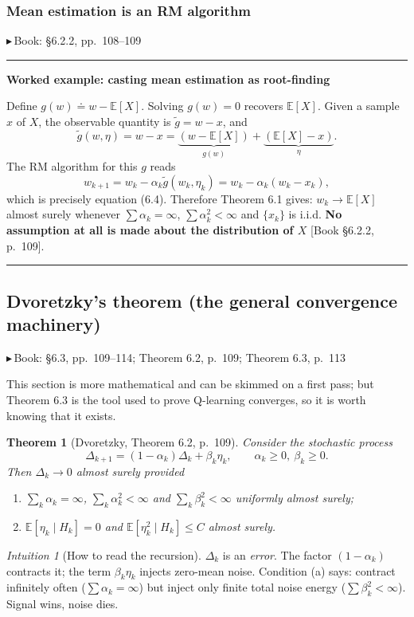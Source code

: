 \documentclass[11pt, letterpaper]{article}
\theoremstyle{runin}
\theoremstyle{runinplain}
\newtheorem{theorem}{Theorem}[section]
\theoremstyle{remark}
\newtheorem*{intuition}{Intuition}
\newcommand{\E}{\mathbb{E}}
\newcommand{\bk}[1]{{\color{bookblue}\small$\blacktriangleright$\,\textsf{Book: #1}}}
\newcommand{\bkin}[1]{{\color{bookblue}\small[\textsf{Book #1}]}}
\newenvironment{worked}[1]
  {\par\medskip\noindent\rule{\textwidth}{0.4pt}\par\nobreak\vspace{0.3em}
   \noindent\textbf{Worked example: #1}\par\nobreak\vspace{0.2em}\small}
  {\par\nobreak\vspace{0.3em}\noindent\rule{\textwidth}{0.4pt}\par\medskip}
\begin{document}
\subsubsection{Mean estimation is an RM algorithm}

\bk{\S6.2.2, pp.~108--109}

\begin{worked}{casting mean estimation as root-finding}
Define $g(w)\doteq w-\E[X]$. Solving $g(w)=0$ recovers $\E[X]$. Given a sample $x$
of $X$, the observable quantity is $\tilde g=w-x$, and
\[
  \tilde g(w,\eta)= w-x = \underbrace{(w-\E[X])}_{g(w)}+\underbrace{(\E[X]-x)}_{\eta}.
\]
The RM algorithm for this $g$ reads
\[
  w_{k+1}=w_k-\alpha_k\tilde g(w_k,\eta_k)=w_k-\alpha_k(w_k-x_k),
\]
which is precisely equation (6.4). Therefore Theorem 6.1 gives: $w_k\to\E[X]$
almost surely whenever $\sum\alpha_k=\infty$, $\sum\alpha_k^2<\infty$ and
$\{x_k\}$ is i.i.d. \textbf{No assumption at all is made about the distribution of
$X$} \bkin{\S6.2.2, p.~109}.
\end{worked}

\subsection{Dvoretzky's theorem (the general convergence machinery)}

\bk{\S6.3, pp.~109--114; Theorem 6.2, p.~109; Theorem 6.3, p.~113}

This section is more mathematical and can be skimmed on a first pass; but
Theorem 6.3 is the tool used to prove Q-learning converges, so it is worth knowing
that it exists.

\begin{theorem}[Dvoretzky, Theorem 6.2, p.~109]
Consider the stochastic process
\[
  \Delta_{k+1}=(1-\alpha_k)\Delta_k+\beta_k\eta_k,
  \qquad \alpha_k\ge0,\ \beta_k\ge0 .
\]
Then $\Delta_k\to0$ almost surely provided
\begin{enumerate}
  \item[(a)] $\sum_k\alpha_k=\infty$, $\sum_k\alpha_k^2<\infty$ and
             $\sum_k\beta_k^2<\infty$ uniformly almost surely;
  \item[(b)] $\E[\eta_k\mid H_k]=0$ and $\E[\eta_k^2\mid H_k]\le C$ almost surely.
\end{enumerate}
\end{theorem}

\begin{intuition}[How to read the recursion]
$\Delta_k$ is an \emph{error}. The factor $(1-\alpha_k)$ contracts it; the term
$\beta_k\eta_k$ injects zero-mean noise. Condition (a) says: contract infinitely
often ($\sum\alpha_k=\infty$) but inject only finite total noise energy
($\sum\beta_k^2<\infty$). Signal wins, noise dies.
\end{intuition}
\end{document}
